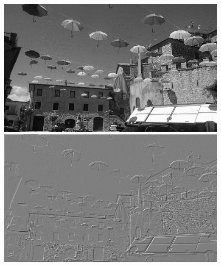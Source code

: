 \documentclass{article}
\begin{document}
	\begin{figure}[!ht]	
	\centering	
	\includegraphics[scale=1.2]{img/gray-obraz1}
	\includegraphics[scale=1.2]{img/filtrowanie/gray-gornoprzepustowe-robertsa}
	

\end{figure}
\end{document}
